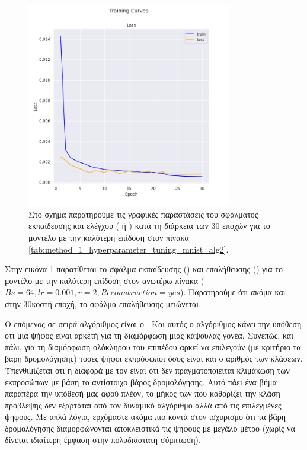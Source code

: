 \begin{figure}[h]
    \centering
    \includegraphics[width=0.8\textwidth]{images/chapter experiments/method 1/image 2/train_curve.png}
    \caption{Στο σχήμα παρατηρούμε τις γραφικές παραστάσεις του σφάλματος εκπαίδευσης και ελέγχου ( ή ) κατά τη διάρκεια των 30 εποχών για το μοντέλο με την καλύτερη επίδοση στον πίνακα \ref{tab:method_1_hyperparameter_tuning_mnist_alg2}.}
    \label{fig:exp_method_1_mnist_alg2}
  \end{figure}
Στην εικόνα \ref{fig:exp_method_1_mnist_alg2} παρατίθεται το σφάλμα εκπαίδευσης () και επαλήθευσης () για το μοντέλο με την καλύτερη επίδοση στον ανωτέρω πίνακα ($Bs = 64, lr = 0.001, r = 2, Reconstruction = yes$). Παρατηρούμε ότι ακόμα και στην 30κοστή εποχή, το σφάλμα επαλήθευσης μειώνεται.\par

Ο επόμενος σε σειρά αλγόριθμος είναι ο . Και αυτός ο αλγόριθμος κάνει την υπόθεση ότι μια ψήφος είναι αρκετή για τη διαμόρφωση μιας κάψουλας γονέα. Συνεπώς, και πάλι, για τη διαμόρφωση ολόκληρου του επιπέδου  αρκεί να επιλεγούν (με κριτήριο τα βάρη δρομολόγησης) τόσες ψήφοι εκπρόσωποι όσος είναι και ο αριθμός των κλάσεων. Υπενθιμίζεται ότι η διαφορά με τον  είναι ότι δεν πραγματοποιείται κλιμάκωση των εκπροσώπων με βάση το αντίστοιχο βάρος δρομολόγησης. Αυτό πάει ένα βήμα παραπέρα την υπόθεσή μας αφού πλέον, το μήκος των  που καθορίζει την κλάση πρόβλεψης δεν εξαρτάται από τον δυναμικό αλγόριθμο αλλά από τις επιλεγμένες ψήφους. Με απλά λόγια, ερχόμαστε ακόμα πιο κοντά στον ισχυρισμό ότι τα βάρη δρομολόγησης διαμορφώνονται αποκλειστικά τις ψήφους με μεγάλο μέτρο (χωρίς να δίνεται ιδιαίτερη έμφαση στην πολυδιάστατη σύμπτωση).\par


